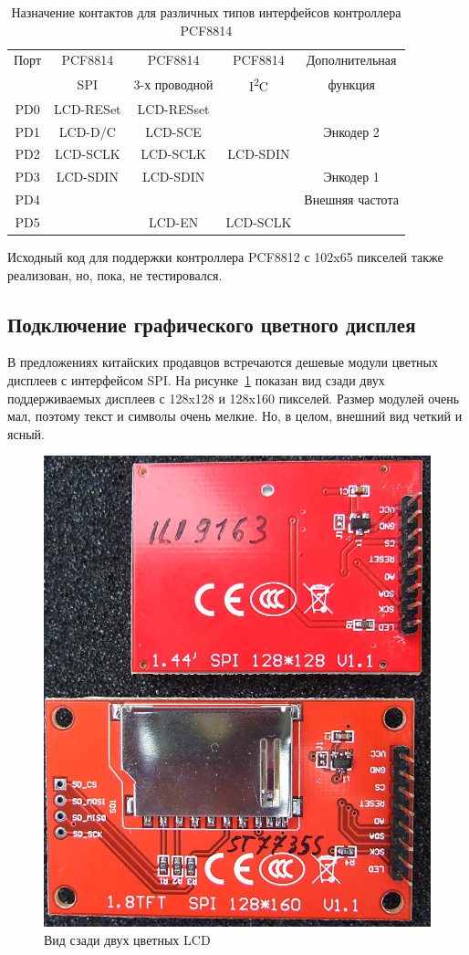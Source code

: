 \begin{table}[H]
  \begin{center}
    \begin{tabular}{| c || c | c | c | c |}
    \hline
     Порт  &  PCF8814    & PCF8814        & PCF8814     & Дополнительная \\
           &    SPI      & 3-х проводной  & I\textsuperscript{2}C  & функция \\
    \hline
    \hline
    PD0    &   LCD-RESet  & LCD-RESset       &            & \\
    \hline
    PD1    &   LCD-D/C   & LCD-SCE        &             & Энкодер 2 \\
    \hline
    PD2    &   LCD-SCLK  & LCD-SCLK       &  LCD-SDIN   & \\
    \hline
    PD3    &   LCD-SDIN  & LCD-SDIN       &             & Энкодер 1 \\
    \hline
    PD4    &             &                &             & Внешняя частота \\
    \hline
    PD5    &             & LCD-EN         &   LCD-SCLK  & \\
    \hline
    \end{tabular}
  \end{center}
  \caption{Назначение контактов для различных типов интерфейсов контроллера PCF8814}
  \label{tab:PCF8814-con}
\end{table}

Исходный код для поддержки контроллера PCF8812 с 102x65 пикселей также реализован, 
но, пока, не тестировался.

\subsection{Подключение графического цветного дисплея}

В предложениях китайских продавцов встречаются дешевые модули цветных дисплеев с интерфейсом SPI.
На рисунке~\ref{fig:Color_both} показан вид сзади двух поддерживаемых дисплеев с 128x128 и 
128x160 пикселей.
Размер модулей очень мал, поэтому текст и символы очень мелкие.
Но, в целом, внешний вид четкий и ясный.

\begin{figure}[H]
\centering
\includegraphics[width=.46\textwidth]{../PNG/Color_ILI9163_ST7735.jpg}
\caption{Вид сзади двух цветных LCD}
\label{fig:Color_both}
\end{figure}

